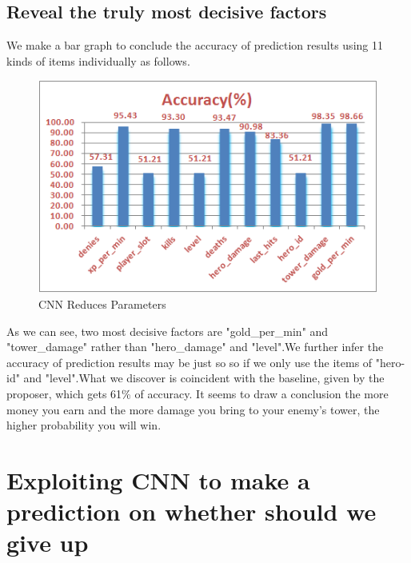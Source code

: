 \documentclass[a4paper, 11pt]{article} %
\begin{document}
\subsection{Reveal the truly most decisive factors}

We make a bar graph to conclude the accuracy of prediction results using 11 kinds 
of items individually as follows.
\begin{figure}[h]
	\centering 
	\includegraphics[width=0.8\linewidth]{Figure3.png}
	\caption{CNN Reduces Parameters}
	\label{fig:subfig}
\end{figure}

As we can see, two most decisive factors are "gold\_per\_min" and "tower\_damage" rather than "hero\_damage" and "level".We further infer the accuracy of prediction results may be just so so if we only use the items of "hero-id" and "level".What we discover is coincident with the baseline, given by the proposer, which gets 61\% of accuracy. It seems to draw a conclusion the more money you earn and the more damage you bring to your enemy's tower, the higher probability you will win.


\section{Exploiting CNN to make a prediction on whether should we give up}
\end{document}
